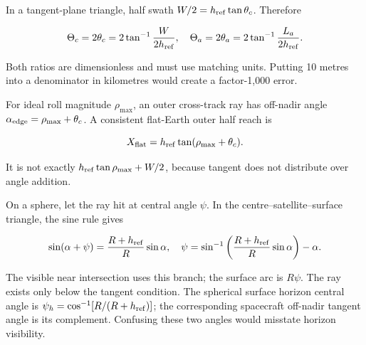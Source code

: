 \documentclass[10pt,a4paper]{article}
\numberwithin{equation}{section}
\begin{document}
\begin{sloppypar}In a tangent-plane triangle, half swath \(W/2=h_{\rm ref}\tan\theta_c\). Therefore\end{sloppypar}


\begin{equation}\Theta_c=2\theta_c=2\tan^{-1}\frac{W}{2h_{\rm ref}},
\quad
\Theta_a=2\theta_a=2\tan^{-1}\frac{L_a}{2h_{\rm ref}}.\label{eq:swath}\end{equation}

\begin{sloppypar}Both ratios are dimensionless and must use matching units. Putting 10 metres into a denominator in kilometres would create a factor-1,000 error.\end{sloppypar}


\begin{sloppypar}For ideal roll magnitude \(\rho_{\max}\), an outer cross-track ray has off-nadir angle \(\alpha_{\rm edge}=\rho_{\max}+\theta_c\). A consistent flat-Earth outer half reach is\end{sloppypar}


\begin{equation}X_{\rm flat}=h_{\rm ref}\tan(\rho_{\max}+\theta_c).\label{eq:ch6-2}\end{equation}

\begin{sloppypar}It is not exactly \(h_{\rm ref}\tan\rho_{\max}+W/2\), because tangent does not distribute over angle addition.\end{sloppypar}


\begin{sloppypar}On a sphere, let the ray hit at central angle \(\psi\). In the centre--satellite--surface triangle, the sine rule gives\end{sloppypar}


\begin{equation}\sin(\alpha+\psi)=\frac{R+h_{\rm ref}}{R}\sin\alpha,\quad
\psi=\sin^{-1}\left(\frac{R+h_{\rm ref}}R\sin\alpha\right)-\alpha.\label{eq:ch6-3}\end{equation}

\begin{sloppypar}The visible near intersection uses this branch; the surface arc is \(R\psi\). The ray exists only below the tangent condition. The spherical surface horizon central angle is \(\psi_h=\cos^{-1}[R/(R+h_{\rm ref})]\); the corresponding spacecraft off-nadir tangent angle is its complement. Confusing these two angles would misstate horizon visibility.\end{sloppypar}
\end{document}
